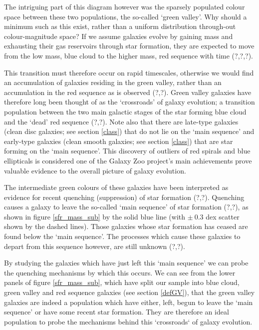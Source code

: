 \documentclass{mn2e}
\begin{document}
The intriguing part of this diagram however was the sparsely populated colour space between these two populations, the so-called `green valley'. Why should a minimum such as this exist, rather than a uniform distribution through-out colour-magnitude space? If we assume galaxies evolve by gaining mass and exhausting their gas reservoirs through star formation, they are expected to move from the low mass, blue cloud to the higher mass, red sequence with time (?,?,?). 

This transition must therefore occur on rapid timescales, otherwise we would find an accumulation of galaxies residing in the green valley, rather than an accumulation in the red sequence as is observed (?,?). Green valley galaxies have therefore long been thought of as the `crossroads' of galaxy evolution; a transition population between the two main galactic stages of the star forming blue cloud and the `dead' red sequence (?,?). Note also that there are late-type galaxies (clean disc galaxies; see section \ref{class}) that do not lie on the `main sequence' and early-type galaxies (clean smooth galaxies; see section \ref{class}) that are star forming on the `main sequence'. This discovery of outliers of red spirals and blue ellipticals is considered one of the Galaxy Zoo project's main achievements prove valuable evidence to the overall picture of galaxy evolution. 

The intermediate green colours of these galaxies have been interpreted as evidence for recent quenching (suppression) of star formation (?,?). Quenching causes a galaxy to leave the so-called `main sequence' of star formation (?,?), as shown in figure \ref{sfr_mass_sub} by the solid blue line (with $\pm ~0.3$ dex scatter shown by the dashed lines). Those galaxies whose star formation has ceased are found below the `main sequence'. The processes which cause these galaxies to depart from this sequence however, are still unknown (?,?).

By studying the galaxies which  have just left this `main sequence' we can probe the quenching mechanisms by which this occurs. We can see from the lower panels of figure \ref{sfr_mass_sub}, which have split our sample into blue cloud, green valley and red sequence galaxies (see section \ref{defGV}), that the green valley galaxies are indeed a population which have either, left, begun to leave the `main sequence' or have some recent star formation. They are therefore an ideal population to probe the mechanisms behind this `crossroads` of galaxy evolution.
\end{document}
